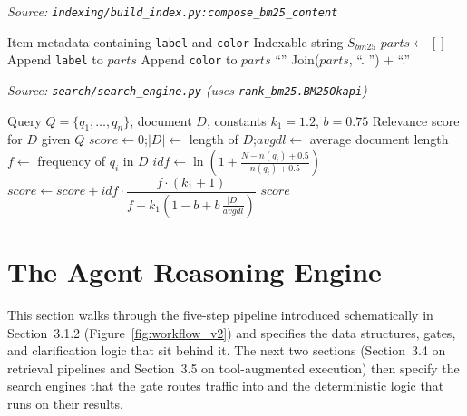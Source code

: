 \begin{algorithm}[H]
\caption{BM25 Content Composition for Lexical Retrieval}\label{alg:bm25_composition}
\textit{Source: \texttt{indexing/build\_index.py:compose\_bm25\_content}}
\begin{algorithmic}[1]
\Require Item metadata containing \texttt{label} and \texttt{color}
\Ensure Indexable string $S_{bm25}$
    \State $parts \gets []$
    \State Append \texttt{label} to $parts$\EndIf
    \State Append \texttt{color} to $parts$\EndIf
    \State \Return ``''\EndIf
    \State \Return Join($parts$, ``. '') $+$ ``.''
\EndFunction
\end{algorithmic}
\end{algorithm}

\begin{algorithm}[H]
\caption{BM25 Scoring}\label{alg:bm25_scoring}
\textit{Source: \texttt{search/search\_engine.py} (uses \texttt{rank\_bm25.BM25Okapi})}
\begin{algorithmic}[1]
\Require Query $Q = \{q_1,\ldots,q_n\}$, document $D$, constants $k_1{=}1.2$, $b{=}0.75$
\Ensure Relevance score for $D$ given $Q$
    \State $score \gets 0$;\quad $|D| \gets$ length of $D$;\quad $avgdl \gets$ average document length
        \State $f \gets$ frequency of $q_i$ in $D$
        \State $idf \gets \ln\!\left(1 + \frac{N - n(q_i) + 0.5}{n(q_i) + 0.5}\right)$
        \State $score \gets score + idf \cdot \dfrac{f \cdot (k_1 + 1)}{f + k_1\!\left(1 - b + b\,\frac{|D|}{avgdl}\right)}$
    \EndFor
    \State \Return $score$
\EndFunction
\end{algorithmic}
\end{algorithm}

\section{The Agent Reasoning Engine}

This section walks through the five-step pipeline introduced schematically in Section~3.1.2 (Figure~\ref{fig:workflow_v2}) and specifies the data structures, gates, and clarification logic that sit behind it. The next two sections (Section~3.4 on retrieval pipelines and Section~3.5 on tool-augmented execution) then specify the search engines that the gate routes traffic into and the deterministic logic that runs on their results.

